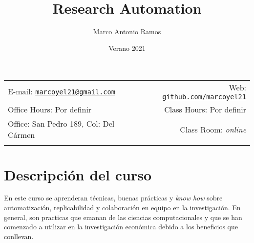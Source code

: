 \documentclass[11pt,]{article}
\title{Research Automation}
\author{Marco Antonio Ramos}
\date{Verano 2021}
\begin{document}
		\maketitle
	

		\thispagestyle{firststyle}



	\noindent \begin{tabular*}{\textwidth}{ @{\extracolsep{\fill}} lr @{\extracolsep{\fill}}}


E-mail: \texttt{\href{mailto:marcoyel21@gmail.com}{\nolinkurl{marcoyel21@gmail.com}}} & Web: \href{http://github.com/marcoyel21}{\tt github.com/marcoyel21}\\
Office Hours: Por definir  &  Class Hours: Por definir\\
Office: San Pedro 189, Col: Del Cármen  & Class Room: \emph{online}\\
	&  \\
	\hline
	\end{tabular*}

\vspace{2mm}



\hypertarget{descripciuxf3n-del-curso}{%
\section{Descripción del curso}\label{descripciuxf3n-del-curso}}

En este curso se aprenderan técnicas, buenas prácticas y \emph{know how}
sobre automatización, replicabilidad y colaboración en equipo en la
investigación. En general, son practicas que emanan de las ciencias
computacionales y que se han comenzado a utilizar en la investigación
económica debido a los beneficios que conllevan.
\end{document}
